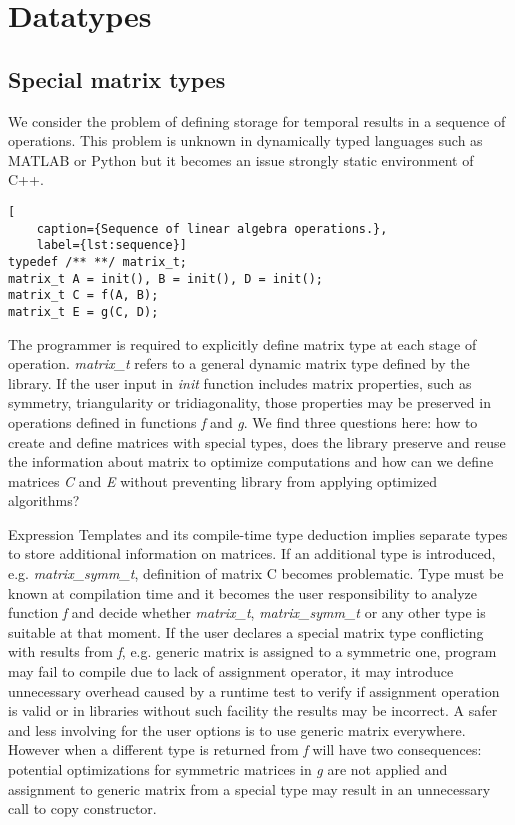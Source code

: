 \documentclass{article}
\begin{document}
\FloatBarrier

\section{Datatypes}

\subsection{Special matrix types}

We consider the problem of defining storage for temporal results in a sequence of operations. This problem is unknown in dynamically typed languages such as MATLAB or Python but it becomes an issue strongly static environment of C++. 

\begin{code}[h]
\begin{lstlisting}[
    caption={Sequence of linear algebra operations.},
    label={lst:sequence}]
typedef /** **/ matrix_t;
matrix_t A = init(), B = init(), D = init();
matrix_t C = f(A, B);
matrix_t E = g(C, D);
\end{lstlisting}
\end{code}

The programmer is required to explicitly define matrix type at each stage of operation. \textit{matrix\_t} refers to a general dynamic matrix type defined by the library. If the user input in \textit{init} function includes matrix properties, such as symmetry, triangularity or tridiagonality, those properties may be preserved in operations defined in functions \textit{f} and \textit{g}. We find three questions here: how to create and define matrices with special types, does the library preserve and reuse the information about matrix to optimize computations and how can we define matrices \textit{C} and \textit{E} without preventing library from applying optimized algorithms?

Expression Templates and its compile-time type deduction implies separate types to store additional information on matrices. If an additional type is introduced, e.g. \textit{matrix\_symm\_t}, definition of matrix C becomes problematic. Type must be known at compilation time and it becomes the user responsibility to analyze function \textit{f} and decide whether \textit{matrix\_t}, \textit{matrix\_symm\_t} or any other type is suitable at that moment. If the user declares a special matrix type conflicting with results from \textit{f}, e.g. generic matrix is assigned to a symmetric one, program may fail to compile due to lack of assignment operator, it may introduce unnecessary overhead caused by a runtime test to verify if assignment operation is valid or in libraries without such facility the results may be incorrect. A safer and less involving for the user options is to use generic matrix everywhere. However when a different type is returned from \textit{f} will have two consequences: potential optimizations for symmetric matrices in \textit{g} are not applied and assignment to generic matrix from a special type may result in an unnecessary call to copy constructor.
\end{document}
